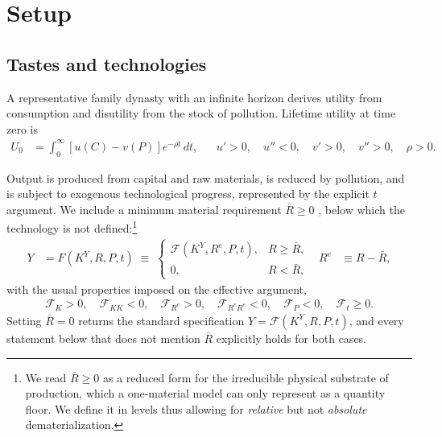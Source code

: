 ﻿\section{Setup}\label{sec:sp:setup}

\subsection{Tastes and technologies}
\label{sec:sp:setup:primitives}


 A representative family dynasty with an infinite horizon derives utility from consumption and disutility from the stock of pollution. Lifetime utility at time zero is
\begin{align}
U_0 &= \int_0^{\infty}\left[u(C)-v(P)\right]e^{-\rho t}\,dt,
&&
u'>0,\quad u''<0,\quad v'>0,\quad v''>0,\quad \rho>0.
\label{eq:sp:setup:utility}
\end{align}

 Output is produced from capital and raw materials, is reduced by pollution, and is subject to exogenous technological progress, represented by the explicit $t$ argument. We include a minimum material requirement $\bar{R}\geq0$ , below which the technology is not defined:\footnote{We read $\bar{R}\geq0$ as a reduced form for the irreducible physical substrate of production, which a one-material model can only represent as a quantity floor. We define it in levels thus allowing for \emph{relative} but not \emph{absolute} dematerialization.}
\begin{align}
Y &= F\left(K^Y,R,P,t\right)\;\equiv\;
\begin{cases}
\mathcal F\left(K^Y,R^{e},P,t\right), & R\ge\bar R,
\\[0.2em]
0, & R<\bar R,
\end{cases}
&
R^{e} &\equiv R-\bar R,
\label{eq:sp:setup:output}
\end{align}
with the usual properties imposed on the effective argument,
\begin{align}
\mathcal F_K>0,\quad \mathcal F_{KK}<0,\quad \mathcal F_{R^e}>0,\quad \mathcal F_{R^eR^e}<0,\quad \mathcal F_P<0,\quad \mathcal F_t\ge0 .
\label{eq:sp:setup:output-props}
\end{align}
Setting $\bar R=0$ returns the standard specification $Y=\mathcal F\left(K^Y,R,P,t\right)$, and every statement below that does not mention $\bar R$ explicitly holds for both cases.


